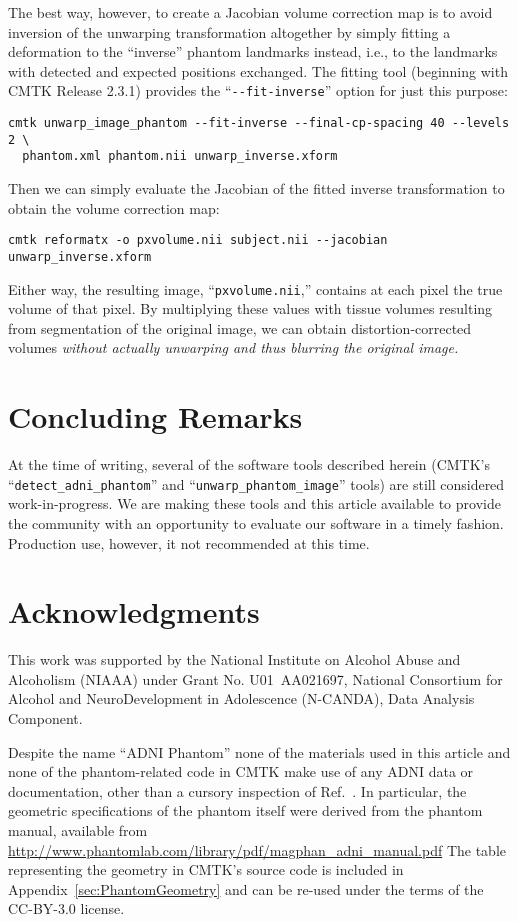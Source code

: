 \documentclass{InsightArticle}
\begin{document}
The best way, however, to create a Jacobian volume correction map is to avoid
inversion of the unwarping transformation altogether by simply fitting a
deformation to the ``inverse'' phantom landmarks instead, i.e., to the
landmarks with detected and expected positions exchanged. The fitting tool
(beginning with CMTK Release 2.3.1) provides the ``\verb|--fit-inverse|''
option for just this purpose:
\begin{verbatim}
cmtk unwarp_image_phantom --fit-inverse --final-cp-spacing 40 --levels 2 \
  phantom.xml phantom.nii unwarp_inverse.xform
\end{verbatim} 
Then we can simply evaluate the Jacobian of the fitted inverse transformation
to obtain the volume correction map:
\begin{verbatim}
cmtk reformatx -o pxvolume.nii subject.nii --jacobian unwarp_inverse.xform
\end{verbatim}


Either way, the resulting image, ``\texttt{pxvolume.nii},'' contains at each
pixel the true volume of that pixel. By multiplying these values with tissue
volumes resulting from segmentation of the original image, we can obtain
distortion-corrected volumes {\em without actually unwarping and thus blurring
the original image.}

\section{Concluding Remarks}

At the time of writing, several of the software tools described herein (CMTK's
``\texttt{detect\_adni\_phantom}'' and ``\texttt{unwarp\_phantom\_image}''
tools) are still considered work-in-progress. We are making these tools and
this article available to provide the community with an opportunity to
evaluate our software in a timely fashion. Production use, however, it not
recommended at this time.

\section*{Acknowledgments}

This work was supported by the National Institute on Alcohol Abuse and
Alcoholism (NIAAA) under Grant No. U01~AA021697, National Consortium for
Alcohol and NeuroDevelopment in Adolescence (N-CANDA), Data Analysis
Component.

Despite the name ``ADNI Phantom'' none of the materials used in this article
and none of the phantom-related code in CMTK make use of any ADNI data or
documentation, other than a cursory inspection of
Ref.~\cite{GuntBernBoro:2009}. In particular, the geometric specifications of
the phantom itself were derived from the phantom manual, available from
\url{http://www.phantomlab.com/library/pdf/magphan_adni_manual.pdf} The table
representing the geometry in CMTK's source code is included in
Appendix~\ref{sec:PhantomGeometry} and can be re-used under the terms of the
CC-BY-3.0 license.
\end{document}
